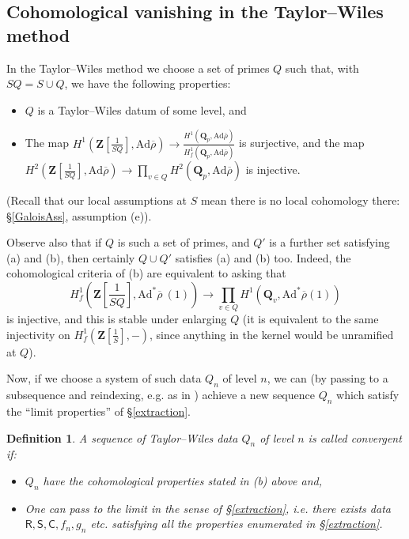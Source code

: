 \documentclass[10pt]{amsart}
\newcommand{\Z}{\mathbf{Z}}
\newcommand{\Ad}{\mathrm{Ad}}
\newcommand{\rhobar}{\overline{\rho}}
\newcommand{\Cinf}{\mathsf{C}}
\newcommand{\Sinf}{\mathsf{S}}
\newcommand{\Rinf}{\mathsf{R}}
\newcommand{\Q}{\mathbf{Q}}
\newcommand{\ramprimes}{S}
\newtheorem{Definition}[subsection]{Definition}
\theoremstyle{remark}
\begin{document}
 

\subsection{ Cohomological vanishing in the  Taylor--Wiles method} \label{TWrecall} 
In  the Taylor--Wiles method we choose a set of primes $Q$ such that, with $SQ=  \ramprimes \cup Q$, we have the following properties:
\begin{itemize}
\item[(a)]  $Q$ is a Taylor--Wiles datum of some level, and
\item[(b)]  The map $H^1(\Z[\frac{1}{SQ}], \Ad \rhobar) \rightarrow \frac{H^1(\Q_p, \Ad \rhobar)}{H^1_f(\Q_p, \Ad \rhobar)}$ is surjective,
and the map $H^2(\Z[\frac{1}{SQ}], \Ad  \rhobar) \rightarrow \prod_{v \in Q} H^2(\Q_p, \Ad \rhobar )$ is injective. 


\end{itemize} 
(Recall that our local assumptions at $S$ mean there is no local cohomology there: \S \ref{GaloisAss}, assumption (e)). 
%
%
%
%


Observe also that if $Q$ is such a set of primes, and $Q'$ is a further set satisfying (a) and (b), then certainly $Q \cup Q'$ satisfies (a) and (b) too.
Indeed, the cohomological criteria of (b) are equivalent to asking that \begin{equation} \label{dual-inj} H^1_f(\Z[\frac{1}{SQ}], \Ad^* \rhobar \ (1)) \rightarrow \prod_{v \in Q} H^1(\Q_v, \Ad^* \rhobar(1))\end{equation}  is injective,  and this  is stable under enlarging $Q$ (it is equivalent to the same injectivity on $H^1_f(\Z[\frac{1}{S}], -)$,
since anything in the kernel would be unramified at $Q$). 

Now, if we choose a system of such data $Q_n$ of level $n$, we can 
(by passing to a subsequence and reindexing, e.g. as in \cite[\S 13.10]{GV}) achieve 
a new sequence $Q_n$ which satisfy the ``limit properties'' of \S \ref{extraction}.  

\begin{Definition} \label{TWconvgt}    
A sequence of Taylor--Wiles data $Q_n$ of level $n$ is called {\em convergent} if:
\begin{itemize} \item[-] $Q_n$ have  the cohomological properties stated in (b) above and, 
\item[-] One can pass to the limit in the sense of \S \ref{extraction}, i.e. there exists data $\Rinf, \Sinf, \Cinf, f_n, g_n$ etc. 
satisfying all the properties enumerated in \S \ref{extraction}.
\end{itemize}
 \end{Definition}
 
\end{document}
